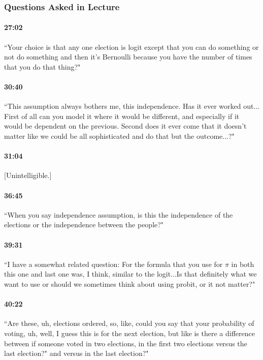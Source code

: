 \documentclass[11pt]{article}
\begin{document}
\subsubsection{Questions Asked in Lecture}

\paragraph{27:02} ``Your choice is that any one election is logit except that you can do something or not do something and then it's Bernoulli because you have the number of times that you do that thing?"

\paragraph{30:40} ``This assumption always bothers me, this independence.  Has it ever worked out... First of all can you model it where it would be different, and especially if it would be dependent on the previous. Second does it ever come that it doesn't matter like we could be all sophisticated and do that but the outcome...?"

\paragraph{31:04} [Unintelligible.]

\paragraph{36:45} ``When you say independence assumption, is this the independence of the elections or the independence between the people?"

\paragraph{39:31} ``I have a somewhat related question: For the formula that you use for $\pi$ in both this one and last one was, I think, similar to the logit...Is that definitely what we want to use or should we sometimes think about using probit, or it not matter?"

\paragraph{40:22} ``Are these, uh, elections ordered, so, like, could you say that your probability of voting, uh, well, I guess this is for the next election, but like is there a difference between if someone voted in two elections, in the first two elections versus the last election?"
 and versus in the last election?"
 
\end{document}
